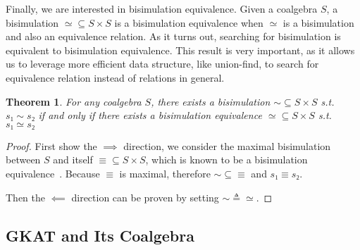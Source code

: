 \documentclass[conference]{IEEEtran}
\newtheorem{theorem}{Theorem}
\begin{document}
Finally, we are interested in bisimulation equivalence.
Given a coalgebra \(S\), a bisimulation \({≃} ⊆ S × S\) is a bisimulation equivalence when \(≃\) is a bisimulation and also an equivalence relation.
As it turns out, searching for bisimulation is equivalent to bisimulation equivalence. 
This result is very important, as it allows us to leverage more efficient data structure, like union-find, to search for equivalence relation instead of relations in general.

\begin{theorem}\label{thm:bisim-iff-bisim-eq}
    For any coalgebra \(S\), there exists a bisimulation \({∼} ⊆ S × S\) s.t. \(s₁ ∼ s₂\) if and only if there exists a bisimulation equivalence \({≃} ⊆ S × S\) s.t. \(s₁ ≃ s₂\)
\end{theorem}

\begin{proof}
    First show the \(⟹\) direction, we consider the maximal bisimulation between \(S\) and itself \({≡} ⊆ S × S\), which is known to be a bisimulation equivalence~\cite[Corollary 5.6]{rutten_UniversalCoalgebraTheory_2000}.
    Because \(≡\) is maximal, therefore \({∼} ⊆ {≡}\) and \(s₁ ≡ s₂\).

    Then the \(⟸\) direction can be proven by setting \({∼} ≜ {≃}\).
\end{proof}

\subsection{GKAT and Its Coalgebra}
\end{document}
